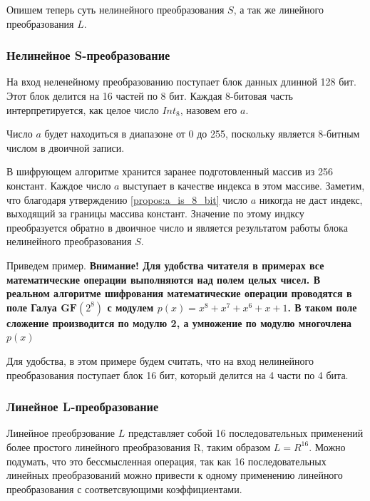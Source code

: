 \documentclass[a4paper, 12pt]{article}
\begin{document}
    Опишем теперь суть нелинейного преобразования $S$, а так же линейного 
    преобразования $L$.

    \subsubsection{Нелинейное S-преобразование}

    На вход неленейному преобразованию поступает блок данных длинной 128 бит. Этот блок
    делится на 16 частей по 8 бит. Каждая 8-битовая часть интерпретируется, как целое 
    число $Int_8$, назовем его $a$. 

    \begin{proposition} \label{propos:a_is_8_bit}
    Число $a$ будет находиться в диапазоне от 0 до 255, поскольку является 8-битным 
    числом в двоичной записи.
    \end{proposition}

    В шифрующем алгоритме хранится заранее подготовленный массив из 256 констант. Каждое
    число $a$ выступает в качестве индекса в этом массиве. Заметим, что благодаря 
    утверждению \ref{propos:a_is_8_bit} число $a$ никогда не даст индекс, выходящий за
    границы массива констант. Значение по этому индксу преобразуется обратно в двоичное 
    число и является результатом работы блока нелинейного преобразования $S$.

    Приведем пример. \textbf{Внимание! Для удобства читателя в примерах все математические операции выполняются над полем целых чисел. В реальном алгоритме шифрования математические операции проводятся в поле Галуа $\mathbf{GF}(2^8)$ с модулем $p(x) = x^8 + x^7 + x^6 + x + 1$. В таком поле сложение производится по модулю 2, а умножение по модулю многочлена $p(x)$}

    \begin{example}

    Для удобства, в этом примере будем считать, что на вход нелинейного преобразования
    поступает блок 16 бит, который делится на 4 части по 4 бита.
    
    \end{example}

    \subsubsection{Линейное L-преобразование}

    Линейное преобрзование $L$ представляет собой 16 последовательных применений более
    простого линейного преобразования R, таким образом $L = R^{16}$. Можно подумать,
    что это бессмысленная операция, так как 16 последовательных линейных
    преобразований можно привести к одному применению линейного преобразования с 
    соответсвующими коэффициентами.
\end{document}
